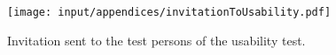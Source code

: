 
\begin{figure}%
	\begin{center}
	\texttt{[image: input/appendices/invitationToUsability.pdf]}
	\end{center}
\caption{Invitation sent to the test persons of the usability test.}%
\label{appendice:usabilitytest}%
\end{figure}